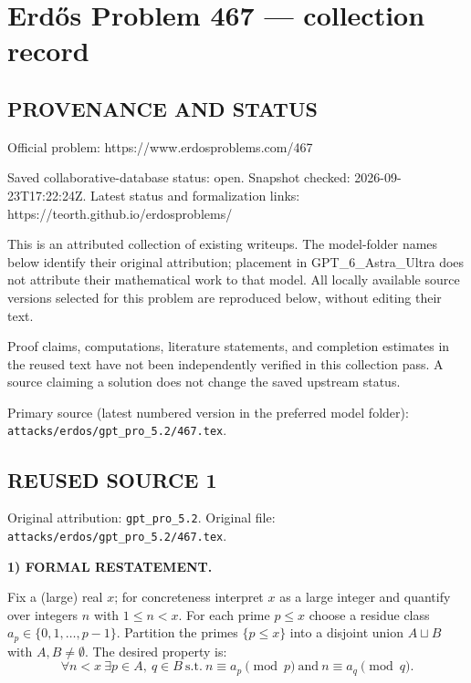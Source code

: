 \section*{Erd\H{o}s Problem 467 --- collection record}

\subsection*{PROVENANCE AND STATUS}
Official problem: https://www.erdosproblems.com/467

Saved collaborative-database status: open.
Snapshot checked: 2026-09-23T17:22:24Z.
Latest status and formalization links: https://teorth.github.io/erdosproblems/

This is an attributed collection of existing writeups. The model-folder names below identify their original attribution; placement in GPT\_6\_Astra\_Ultra does not attribute their mathematical work to that model. All locally available source versions selected for this problem are reproduced below, without editing their text.

Proof claims, computations, literature statements, and completion estimates in the reused text have not been independently verified in this collection pass. A source claiming a solution does not change the saved upstream status.

Primary source (latest numbered version in the preferred model folder): \texttt{attacks/erdos/gpt\_pro\_5.2/467.tex}.

\subsection*{REUSED SOURCE 1}
Original attribution: \texttt{gpt\_pro\_5.2}.
Original file: \texttt{attacks/erdos/gpt\_pro\_5.2/467.tex}.


\noindent\textbf{1) FORMAL RESTATEMENT.}

Fix a (large) real $x$; for concreteness interpret $x$ as a large integer and quantify over integers $n$ with $1\le n<x$. For each prime $p\le x$ choose a residue class $a_p\in\{0,1,\dots,p-1\}$. Partition the primes $\{p\le x\}$ into a disjoint union $A\sqcup B$ with $A,B\ne\emptyset$. The desired property is:
\[
\forall n<x\ \exists p\in A,\ q\in B\ \text{s.t.}\ n\equiv a_p\pmod p\ \text{and}\ n\equiv a_q\pmod q.
\]

